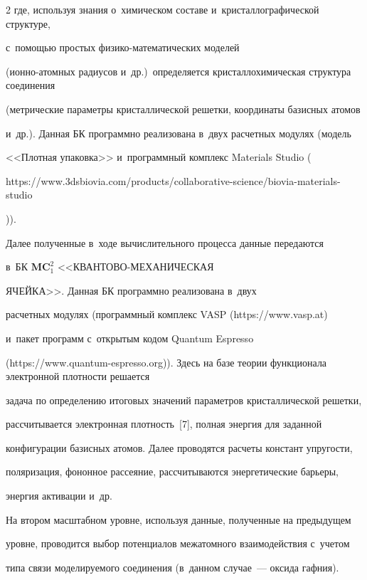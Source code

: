 \begin{multicols}{2}
где, используя знания о~химическом составе и~кристаллографической структуре, 


с~помощью простых фи\-зи\-ко-ма\-те\-ма\-ти\-че\-ских моделей 


(ион\-но-атом\-ных радиусов и~др.)\ определяется кристаллохимическая структура соединения 


(метрические параметры крис\-тал\-ли\-че\-ской решетки, координаты базисных атомов 


и~др.). Данная БК программно реализована в~двух расчетных модулях (модель 


<<Плотная упаковка>> и~программный комплекс Materials Studio ({\sf 


https://www.3dsbiovia.com/products/collaborative-science/biovia-materials-studio})).


     


     Далее полученные в~ходе вычислительного процесса данные передаются 


в~БК $\mathbf{MC}_1^2$ <<КВАН\-ТО\-ВО-МЕ\-ХА\-НИ\-ЧЕ\-СКАЯ 


ЯЧЕЙКА>>. Данная БК программно реализована в~двух 


расчетных модулях (про\-грам\-мный комплекс VASP ({\sf https://www.\linebreak vasp.at}) 


и~пакет программ с~открытым кодом Quantum Espresso 


({\sf https://www.quantum-espresso.org})). Здесь на базе теории функционала электронной плотности решается 


задача по определению итоговых значений параметров кристаллической решетки, 


рассчитывается электронная плотность~[7], полная энергия для заданной 


конфигурации базисных атомов. Далее проводятся расчеты констант упругости, 


поляризация, фононное рассеяние, рассчитываются энергетические барьеры, 


энергия активации и~др.


    


На втором масштабном уровне, используя данные, полученные на предыдущем 


уровне, проводится выбор потенциалов межатомного взаимодействия с~учетом 


типа связи моделируемого \mbox{соединения} (в~данном случае~--- оксида гафния). 



\end{multicols}
